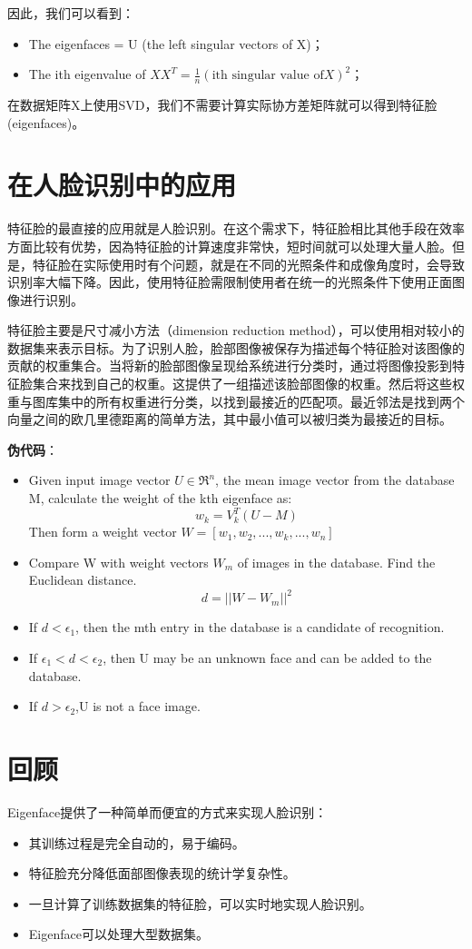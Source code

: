 \documentclass[UTF8]{ctexart}
\begin{document}
因此，我们可以看到：
\begin{itemize}
	\item The eigenfaces = U (the left singular vectors of X)；
	\item The ith eigenvalue of  $XX^{T} = \frac {1}{n} ( \text{ith singular value of} X)^{2}$；
\end{itemize}
在数据矩阵X上使用SVD，我们不需要计算实际协方差矩阵就可以得到特征脸(eigenfaces)。

\section{在人脸识别中的应用}
特征脸的最直接的应用就是人脸识别。在这个需求下，特征脸相比其他手段在效率方面比较有优势，因為特征脸的计算速度非常快，短时间就可以处理大量人脸。但是，特征脸在实际使用时有个问题，就是在不同的光照条件和成像角度时，会导致识别率大幅下降。因此，使用特征脸需限制使用者在统一的光照条件下使用正面图像进行识别。

特征脸主要是尺寸减小方法（dimension reduction method），可以使用相对较小的数据集来表示目标。为了识别人脸，脸部图像被保存为描述每个特征脸对该图像的贡献的权重集合。当将新的脸部图像呈现给系统进行分类时，通过将图像投影到特征脸集合来找到自己的权重。这提供了一组描述该脸部图像的权重。然后将这些权重与图库集中的所有权重进行分类，以找到最接近的匹配项。最近邻法是找到两个向量之间的欧几里德距离的简单方法，其中最小值可以被归类为最接近的目标。

{\bf{伪代码}}：
\begin{itemize}
	\item Given input image vector $U\in \Re ^{n}$, the mean image vector from the database  M, calculate the weight of the kth eigenface as:
$$ w_{k}=V_{k}^{T}(U-M)$$
Then form a weight vector $W=[w_{1},w_{2},...,w_{k},...,w_{n}]$
	\item Compare W with weight vectors $W_{m}$ of images in the database. Find the Euclidean distance.
$$d=||W-W_{m}||^{2}$$
	\item If $d<\epsilon_{1}$, then the mth entry in the database is a candidate of recognition.
	\item If $\epsilon_{1}<d<\epsilon_{2}$, then U may be an unknown face and can be added to the database.
	\item If  $d>\epsilon_{2}$,U is not a face image.
\end{itemize}

\section{回顾}
Eigenface提供了一种简单而便宜的方式来实现人脸识别：
\begin{itemize}
	\item 其训练过程是完全自动的，易于编码。
	\item 特征脸充分降低面部图像表现的统计学复杂性。
	\item 一旦计算了训练数据集的特征脸，可以实时地实现人脸识别。
	\item Eigenface可以处理大型数据集。
\end{itemize}
\end{document}
